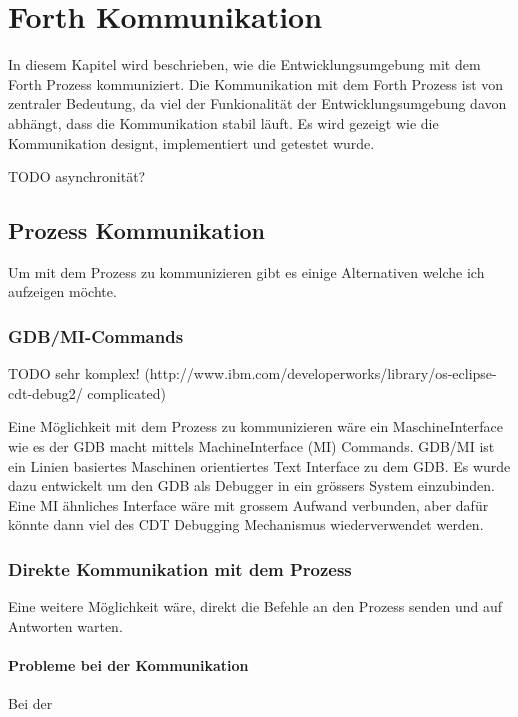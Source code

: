 \chapter{Forth Kommunikation}
\label{forthcommunication}

In diesem Kapitel wird beschrieben, wie die Entwicklungsumgebung mit dem Forth Prozess kommuniziert. Die Kommunikation mit dem Forth Prozess ist von zentraler Bedeutung, da viel der Funkionalität der Entwicklungsumgebung davon abhängt, dass die Kommunikation stabil läuft. Es wird gezeigt wie die Kommunikation designt, implementiert und getestet wurde.

TODO asynchronität?


\section{Prozess Kommunikation}
Um mit dem Prozess zu kommunizieren gibt es einige Alternativen welche ich aufzeigen möchte.

\subsection{GDB/MI-Commands}

TODO sehr komplex! (http://www.ibm.com/developerworks/library/os-eclipse-cdt-debug2/ complicated)

Eine Möglichkeit mit dem Prozess zu kommunizieren wäre ein MaschineInterface wie es der GDB macht mittels MachineInterface (MI)  Commands. GDB/MI ist ein Linien basiertes Maschinen orientiertes Text Interface zu dem GDB. Es wurde dazu entwickelt um den GDB als Debugger in ein grössers System einzubinden.\cite{gdb} Eine MI ähnliches Interface wäre mit grossem Aufwand verbunden, aber dafür könnte dann viel des CDT Debugging Mechanismus wiederverwendet werden. 

\subsection{Direkte Kommunikation mit dem Prozess}

Eine weitere Möglichkeit wäre, direkt die Befehle an den Prozess senden und auf Antworten warten.

\subsubsection{Probleme bei der Kommunikation}

Bei der


